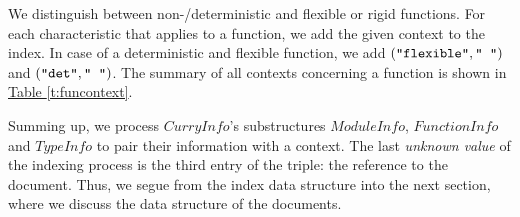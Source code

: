 \documentclass[%
	latex,%
	a4paper,%
	oneside,%
	chapterprefix,%
	headsepline,%
	12pt%
]{scrbook}
\newcommand{\Conid}[1]{\mathit{#1}}
\begin{document}
\begin{table}[h]
\caption{The contexts for a \ensuremath{\Conid{TypeInfo}} data structure}
\label{t:typcontext}
\end{table}

We distinguish between non-/deterministic and flexible or rigid
functions. %
For each characteristic that applies to a function, we add the given
context to the index. %
In case of a deterministic and flexible function, we
add \ensuremath{(\text{\tt \char34 flexible\char34},\text{\tt \char34 ~\char34})} and \ensuremath{(\text{\tt \char34 det\char34},\text{\tt \char34 ~\char34})}. %
The summary of all contexts concerning a function is shown in
\hyperref[t:funcontext]{Table \ref{t:funcontext}}.

\begin{table}[h]
\caption{The contexts for a \ensuremath{\Conid{FunctionInfo}} data structure}
\label{t:funcontext}
\end{table}

Summing up, we process \ensuremath{\Conid{CurryInfo}}'s substructures \ensuremath{\Conid{ModuleInfo}},
\ensuremath{\Conid{FunctionInfo}} and \ensuremath{\Conid{TypeInfo}} to pair their information with a
context. %
The last \emph{unknown value} of the indexing process is the third
entry of the triple: the reference to the document. %
Thus, we segue from the index data structure into the next section,
where we discuss the data structure of the documents. %
\end{document}
